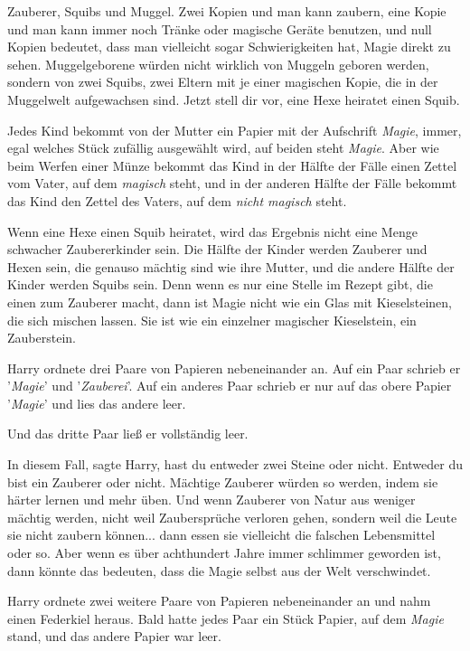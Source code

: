 Zauberer, Squibs und Muggel. Zwei Kopien und man kann zaubern, eine Kopie und
man kann immer noch Tränke oder magische Geräte benutzen, und null Kopien
bedeutet, dass man vielleicht sogar Schwierigkeiten hat, Magie direkt zu sehen.
Muggelgeborene würden nicht wirklich von Muggeln geboren werden, sondern von
zwei Squibs, zwei Eltern mit je einer magischen Kopie, die in der Muggelwelt
aufgewachsen sind. Jetzt stell dir vor, eine Hexe heiratet einen Squib.

Jedes Kind bekommt von der Mutter ein Papier mit der Aufschrift \glqq
\emph{Magie}\grqq{}, immer, egal welches Stück zufällig ausgewählt wird, auf
beiden steht \glqq \emph{Magie}\grqq{}. Aber wie beim Werfen einer Münze bekommt
das Kind in der Hälfte der Fälle einen Zettel vom Vater, auf dem \glqq
\emph{magisch}\grqq{} steht, und in der anderen Hälfte der Fälle bekommt das
Kind den Zettel des Vaters, auf dem \emph{\glqq nicht magisch\grqq{} } steht.

Wenn eine Hexe einen Squib heiratet, wird das Ergebnis nicht eine Menge
schwacher Zaubererkinder sein. Die Hälfte der Kinder werden Zauberer und Hexen
sein, die genauso mächtig sind wie ihre Mutter, und die andere Hälfte der Kinder
werden Squibs sein. Denn wenn es nur eine Stelle im Rezept gibt, die einen zum
Zauberer macht, dann ist Magie nicht wie ein Glas mit Kieselsteinen, die sich
mischen lassen. Sie ist wie ein einzelner magischer Kieselstein, ein
Zauberstein.\grqq{}

Harry ordnete drei Paare von Papieren nebeneinander an. Auf ein Paar schrieb er
'\emph{Magie}' und '\emph{Zauberei}'. Auf ein anderes Paar schrieb er nur auf
das obere Papier '\emph{Magie}' und lies das andere leer.

Und das dritte Paar ließ er vollständig leer.

\glqq In diesem Fall\grqq{}, sagte Harry, \glqq hast du entweder zwei Steine
oder nicht. Entweder du bist ein Zauberer oder nicht. Mächtige Zauberer würden
so werden, indem sie härter lernen und mehr üben. Und wenn Zauberer von Natur
aus weniger mächtig werden, nicht weil Zaubersprüche verloren gehen, sondern
weil die Leute sie nicht zaubern können... dann essen sie vielleicht die
falschen Lebensmittel oder so. Aber wenn es über achthundert Jahre immer
schlimmer geworden ist, dann könnte das bedeuten, dass die Magie selbst aus der
Welt verschwindet.\grqq{}

Harry ordnete zwei weitere Paare von Papieren nebeneinander an und nahm einen
Federkiel heraus. Bald hatte jedes Paar ein Stück Papier, auf dem \glqq
\emph{Magie}\grqq{} stand, und das andere Papier war leer.


